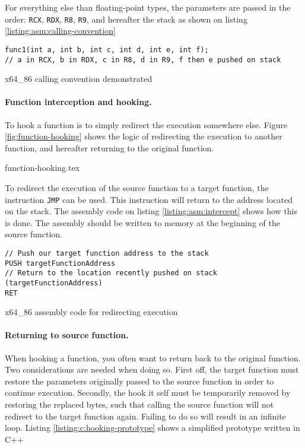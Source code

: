 \documentclass{report}
\begin{document}
For everything else than floating-point types, the parameters are passed in the order: \texttt{RCX}, \texttt{RDX}, \texttt{R8}, \texttt{R9}, and hereafter the stack as shown on listing \ref{listing:asm:calling-convention}

\begin{listing}[H]
\begin{verbatim}
func1(int a, int b, int c, int d, int e, int f);
// a in RCX, b in RDX, c in R8, d in R9, f then e pushed on stack
\end{verbatim}
\caption{x64\_86 calling convention demonstrated\cite{url:hooking:asm:calling-convention:x64}}
\label{listing:asm:calling-convention}
\end{listing}

\paragraph{Function interception and hooking.} To hook a function is to simply redirect the execution somewhere else. Figure \ref{fig:function-hooking} shows the logic of redirecting the execution to another function, and hereafter returning to the original function.

{function-hooking.tex}

To redirect the execution of the source function to a target function, the instruction \texttt{JMP}\cite{url:hooking:asm:ret} can be used. This instruction will return to the address located on the stack. The assembly code on listing \ref{listing:asm:intercept} shows how this is done. The assembly should be written to memory at the beginning of the source function.

\begin{listing}[H]
\begin{verbatim}
// Push our target function address to the stack
PUSH targetFunctionAddress
// Return to the location recently pushed on stack (targetFunctionAddress)
RET
\end{verbatim}
\caption{x64\_86 assembly code for redirecting execution}
\label{listing:asm:intercept}
\end{listing}

\paragraph{Returning to source function.} When hooking a function, you often want to return back to the original function. Two considerations are needed when doing so. First off, the target function must restore the parameters originally passed to the source function in order to continue execution. Secondly, the hook it self must be temporarily removed by restoring the replaced bytes, such that calling the source function will not redirect to the target function again. Failing to do so will result in an infinite loop. Listing \ref{listing:c:hooking-prototype} shows a simplified prototype written in C++
\end{document}
